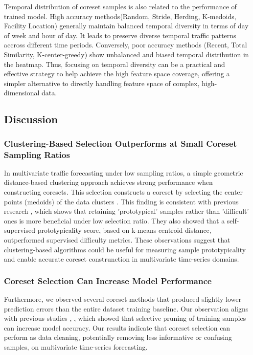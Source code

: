 Temporal distribution of coreset samples is also related to the performance of trained model. High accuracy methods(Random, Stride, Herding, K-medoids, Facility Location) generally maintain balanced temporal diversity in terms of day of week and hour of day. It leads to preserve diverse temporal traffic patterns accross different time periods. Conversely, poor accuracy methods (Recent, Total Similarity, K-center-greedy) show unbalanced and biased temporal distribution in the heatmap. Thus, focusing on temporal diversity can be a practical and effective strategy to help achieve the high feature space coverage, offering a simpler alternative to directly handling feature space of complex, high-dimensional data.



\subsection{Discussion}
\subsubsection{Clustering-Based Selection Outperforms at Small Coreset Sampling Ratios
}
In multivariate traffic forecasting under low sampling ratios, a simple geometric distance-based clustering approach achieves strong performance when constructing coresets. This selection constructs a coreset by selecting the center points (medoids) of the data clusters \cite{kaufmann_clustering_1987}. This finding is consistent with previous research \cite{sorscher_beyond_2022}, which shows that retaining 'prototypical' samples rather than 'difficult' ones is more beneficial under low selection ratio. They also showed that a self-supervised prototypicality score, based on k-means centroid distance, outperformed supervised difficulty metrics. These observations suggest that clustering-based algorithms could be useful for measuring sample prototypicality and enable accurate coreset construnction in multivariate time-series domains.




\subsubsection{Coreset Selection Can Increase Model Performance}
Furthermore, we observed several coreset methods that produced slightly lower prediction errors than the entire dataset training baseline. Our observation aligns with previous studies \cite{paul_deep_2021}, \cite{tan_data_2025}, which showed that selective pruning of training samples can increase model accuracy. Our results indicate that coreset selection can perform as data cleaning, potentially removing less informative or confusing samples, on multivariate time-series forecasting.


